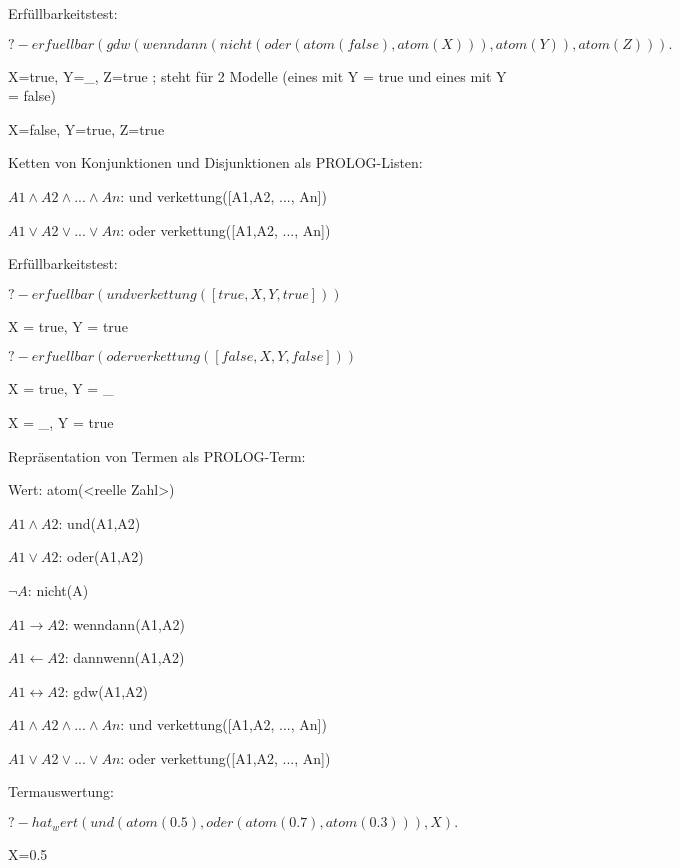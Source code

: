 \documentclass[a4paper]{article}
\begin{document}
\begin{multicols}{3}
  Erfüllbarkeitstest:
  \begin{itemize*}
    \item $?- erfuellbar(gdw(wenndann(nicht(oder(atom(false),atom(X))),atom(Y)), atom(Z))).$
    \item X=true, Y=\_, Z=true ; steht für 2 Modelle (eines mit Y = true und eines mit Y = false)
    \item X=false, Y=true, Z=true
  \end{itemize*}

  Ketten von Konjunktionen und Disjunktionen als PROLOG-Listen:
  \begin{itemize*}
    \item $A1\wedge A2\wedge ... \wedge An$: und verkettung([A1,A2, ..., An])
    \item $A1\vee A2\vee ...\vee An$: oder verkettung([A1,A2, ..., An])
  \end{itemize*}

  Erfüllbarkeitstest:
  \begin{itemize*}
    \item $?- erfuellbar(undverkettung([true,X,Y,true]))$
    \item X = true, Y = true
    \item $?- erfuellbar(oderverkettung([false,X,Y,false]))$
    \item X = true, Y = \_
    \item X = \_, Y = true
  \end{itemize*}

  Repräsentation von Termen als PROLOG-Term:
  \begin{itemize*}
    \item Wert: atom(<reelle Zahl>)
    \item $A1\wedge A2$: und(A1,A2)
    \item $A1\vee A2$: oder(A1,A2)
    \item $\lnot A$: nicht(A)
    \item $A1\rightarrow A2$: wenndann(A1,A2)
    \item $A1\leftarrow A2$: dannwenn(A1,A2)
    \item $A1\leftrightarrow A2$: gdw(A1,A2)
    \item $A1\wedge A2\wedge ... \wedge An$: und verkettung([A1,A2, ..., An])
    \item $A1\vee A2\vee ...\vee An$: oder verkettung([A1,A2, ..., An])
  \end{itemize*}

  Termauswertung:
  \begin{itemize*}
    \item $?- hat_wert(und(atom(0.5),oder(atom(0.7),atom(0.3))),X).$
    \item X=0.5
  \end{itemize*}


\end{multicols}
\end{document}

